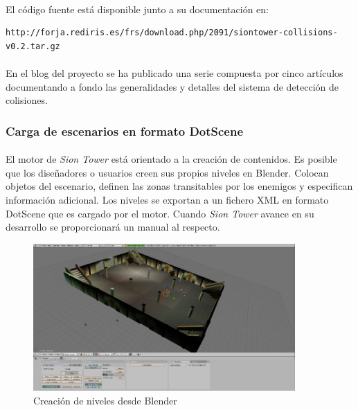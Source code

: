 \documentclass[16pt,spanish]{article}
\def \juego{\emph {Sion Tower} }
\begin{document}
\paragraph{}
El código fuente está disponible junto a su documentación en:

\begin{verbatim}
http://forja.rediris.es/frs/download.php/2091/siontower-collisions-v0.2.tar.gz
\end{verbatim}

\paragraph{}
En el blog del proyecto se ha publicado una serie compuesta por cinco artículos
documentando a fondo las generalidades y detalles del sistema de detección
de colisiones.

\subsubsection{Carga de escenarios en formato DotScene}

\paragraph{}
El motor de \juego está orientado a la creación de contenidos. Es posible
que los diseñadores o usuarios creen sus propios niveles en Blender. Colocan
objetos del escenario, definen las zonas transitables por los enemigos y
especifican información adicional. Los niveles se exportan a un fichero
XML en formato DotScene que es cargado por el motor. Cuando \juego avance
en su desarrollo se proporcionará un manual al respecto.

\begin{figure}[H]
    \centering
        \includegraphics[width=10cm]{img/niveles-blender.jpg} 
    \caption{Creación de niveles desde Blender}
    \label{img:blender}
\end{figure}
\end{document}
